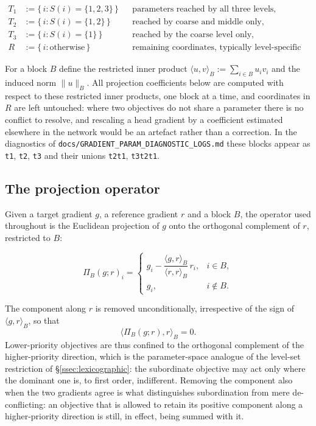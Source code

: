 \[
\begin{aligned}
T_1 &:= \{\, i : S(i) = \{1,2,3\} \,\} && \text{parameters reached by all three levels,}\\
T_2 &:= \{\, i : S(i) = \{1,2\} \,\}   && \text{reached by coarse and middle only,}\\
T_3 &:= \{\, i : S(i) = \{1\} \,\}     && \text{reached by the coarse level only,}\\
R   &:= \{\, i : \text{otherwise} \,\} && \text{remaining coordinates, typically level-specific heads.}
\end{aligned}
\]

For a block $B$ define the restricted inner product
$\langle u,v\rangle_B := \sum_{i\in B} u_i v_i$ and the induced norm
$\lVert u\rVert_B$. All projection coefficients below are computed with respect to these
restricted inner products, one block at a time, and coordinates in $R$ are left untouched:
where two objectives do not share a parameter there is no conflict to resolve, and rescaling a
head gradient by a coefficient estimated elsewhere in the network would be an artefact rather
than a correction. In the diagnostics of \texttt{docs/GRADIENT\_PARAM\_DIAGNOSTIC\_LOGS.md}
these blocks appear as \texttt{t1}, \texttt{t2}, \texttt{t3} and their unions
\texttt{t2t1}, \texttt{t3t2t1}.

\subsection{The projection operator}
\label{ssec:lex_projection}

Given a target gradient $g$, a reference gradient $r$ and a block $B$, the operator used
throughout is the Euclidean projection of $g$ onto the orthogonal complement of $r$, restricted
to $B$:

\[
\Pi_B(g;r)_i =
\begin{cases}
g_i - \dfrac{\langle g,r\rangle_B}{\langle r,r\rangle_B}\, r_i, & i \in B,\\[2ex]
g_i, & i \notin B.
\end{cases}
\]

The component along $r$ is removed unconditionally, irrespective of the sign of
$\langle g,r\rangle_B$, so that
\[
\langle \Pi_B(g;r), r\rangle_B = 0 .
\]
Lower-priority objectives are thus confined to the orthogonal complement of the higher-priority
direction, which is the parameter-space analogue of the level-set restriction of
\S\ref{ssec:lexicographic}: the subordinate objective may act only where the dominant one is, to
first order, indifferent. Removing the component also when the two gradients agree is what
distinguishes subordination from mere de-conflicting: an objective that is allowed to retain its
positive component along a higher-priority direction is still, in effect, being summed with it.

